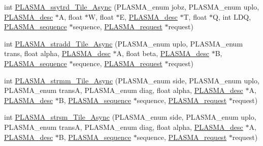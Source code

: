 \begin{DoxyCompactItemize}
\item 
int \hyperlink{group__float__Tile__Async_gab6e8f0c040e24c6f71d24979685683d0_gab6e8f0c040e24c6f71d24979685683d0}{P\+L\+A\+S\+M\+A\+\_\+ssytrd\+\_\+\+Tile\+\_\+\+Async} (P\+L\+A\+S\+M\+A\+\_\+enum jobz, P\+L\+A\+S\+M\+A\+\_\+enum uplo, \hyperlink{structplasma__desc__t}{P\+L\+A\+S\+M\+A\+\_\+desc} $\ast$A, float $\ast$W, float $\ast$E, \hyperlink{structplasma__desc__t}{P\+L\+A\+S\+M\+A\+\_\+desc} $\ast$T, float $\ast$Q, int L\+D\+Q, \hyperlink{structplasma__sequence__t}{P\+L\+A\+S\+M\+A\+\_\+sequence} $\ast$sequence, \hyperlink{structplasma__request__t}{P\+L\+A\+S\+M\+A\+\_\+request} $\ast$request)
\item 
int \hyperlink{group__float__Tile__Async_gaf680181b0e059defb979deb93362cfd5_gaf680181b0e059defb979deb93362cfd5}{P\+L\+A\+S\+M\+A\+\_\+stradd\+\_\+\+Tile\+\_\+\+Async} (P\+L\+A\+S\+M\+A\+\_\+enum uplo, P\+L\+A\+S\+M\+A\+\_\+enum trans, float alpha, \hyperlink{structplasma__desc__t}{P\+L\+A\+S\+M\+A\+\_\+desc} $\ast$A, float beta, \hyperlink{structplasma__desc__t}{P\+L\+A\+S\+M\+A\+\_\+desc} $\ast$B, \hyperlink{structplasma__sequence__t}{P\+L\+A\+S\+M\+A\+\_\+sequence} $\ast$sequence, \hyperlink{structplasma__request__t}{P\+L\+A\+S\+M\+A\+\_\+request} $\ast$request)
\item 
int \hyperlink{group__float__Tile__Async_ga3a6fbd4ed9e9625697c188247e6bce86_ga3a6fbd4ed9e9625697c188247e6bce86}{P\+L\+A\+S\+M\+A\+\_\+strmm\+\_\+\+Tile\+\_\+\+Async} (P\+L\+A\+S\+M\+A\+\_\+enum side, P\+L\+A\+S\+M\+A\+\_\+enum uplo, P\+L\+A\+S\+M\+A\+\_\+enum trans\+A, P\+L\+A\+S\+M\+A\+\_\+enum diag, float alpha, \hyperlink{structplasma__desc__t}{P\+L\+A\+S\+M\+A\+\_\+desc} $\ast$A, \hyperlink{structplasma__desc__t}{P\+L\+A\+S\+M\+A\+\_\+desc} $\ast$B, \hyperlink{structplasma__sequence__t}{P\+L\+A\+S\+M\+A\+\_\+sequence} $\ast$sequence, \hyperlink{structplasma__request__t}{P\+L\+A\+S\+M\+A\+\_\+request} $\ast$request)
\item 
int \hyperlink{group__float__Tile__Async_ga0d73c1a4354ba065c6934e54aeeca7b0_ga0d73c1a4354ba065c6934e54aeeca7b0}{P\+L\+A\+S\+M\+A\+\_\+strsm\+\_\+\+Tile\+\_\+\+Async} (P\+L\+A\+S\+M\+A\+\_\+enum side, P\+L\+A\+S\+M\+A\+\_\+enum uplo, P\+L\+A\+S\+M\+A\+\_\+enum trans\+A, P\+L\+A\+S\+M\+A\+\_\+enum diag, float alpha, \hyperlink{structplasma__desc__t}{P\+L\+A\+S\+M\+A\+\_\+desc} $\ast$A, \hyperlink{structplasma__desc__t}{P\+L\+A\+S\+M\+A\+\_\+desc} $\ast$B, \hyperlink{structplasma__sequence__t}{P\+L\+A\+S\+M\+A\+\_\+sequence} $\ast$sequence, \hyperlink{structplasma__request__t}{P\+L\+A\+S\+M\+A\+\_\+request} $\ast$request)

\end{DoxyCompactItemize}
